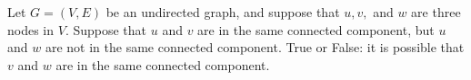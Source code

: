 \begin{prob}
    Let $G = (V, E)$ be an undirected graph, and suppose that $u, v, $ and $w$
    are three nodes in $V$. Suppose that $u$ and $v$ are in the same connected component,
    but $u$ and $w$ are not in the same connected component. True or False: it
    is possible that $v$ and $w$ are in the same connected component.

    \tF{}
\end{prob}
